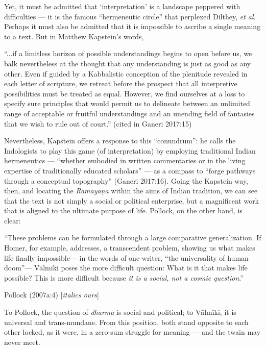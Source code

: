 Yet, it must be admitted that ‘interpretation’ is a landscape peppered with difficulties — it is the famous “hermeneutic circle” that perplexed Dilthey, {\sl et al}. Perhaps it must also be admitted that it is impossible to ascribe a single meaning to a text. But in Matthew Kapstein’s words, 

\begin{myquote}
“...if a limitless horizon of possible understandings begins to open before us, we balk nevertheless at the thought that any understanding is just as good as any other. Even if guided by a Kabbalistic conception of the plenitude revealed in each letter of scripture, we retreat before the prospect that all interpretive possibilities must be treated as equal. However, we find ourselves at a loss to specify sure principles that would permit us to delineate between an unlimited range of acceptable or fruitful understandings and an unending field of fantasies that we wish to rule out of court.”
\hfill (cited in Ganeri 2017:15) 
\end{myquote}

Nevertheless, Kapstein offers a response to this “conundrum”: he calls the Indologists to play this game (of interpretation) by employing traditional Indian hermeneutics — “whether embodied in written commentaries or in the living expertise of traditionally educated scholars” — as a compass to “forge pathways through a conceptual topography” (Ganeri 2017:16). Going the Kapstein way, then, and locating the {\sl Rāmāyaṇa} within the aims of Indian tradition, we can see that the text is not simply a social or political enterprise, but a magnificent work that is aligned to the ultimate purpose of life. Pollock, on the other hand, is clear:

\begin{myquote}
“These problems can be formulated through a large comparative generalization. If Homer, for example, addresses, a transcendent problem, showing us what makes life finally impossible— in the words of one writer, “the universality of human doom”— Vālmīki poses the more difficult question: What is it that makes life possible? This is more difficult because {\sl it is a social, not a cosmic question}.” 

\hfill Pollock (2007a:4) [{\sl italics ours}]
\end{myquote}

To Pollock, the question of {\sl dharma} is social and political; to Vālmīki, it is universal and trans-mundane. From this position, both stand opposite to each other locked, as it were, in a zero-sum struggle for meaning — and the twain may never meet. 

\newpage
\label{notes}
\theendnotes
